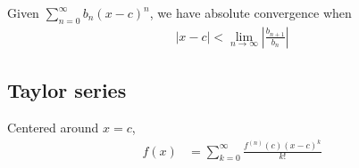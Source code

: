 \documentclass[12pt]{article}
\newcommand{\abs}  [1]{\left|       #1 \right|      }
\begin{document}
\begin{multicols}{2}
Given $\sum_{n=0}^\infty b_n (x-c)^n$, we have absolute convergence when
\begin{align*}
    \abs{x-c} < \lim_{n\to\infty} \abs{\frac{b_{n+1}}{b_n}}
\end{align*}

\subsection*{Taylor series}
Centered around $x=c$,
\begin{align*}
    f(x) &= \sum_{k=0}^\infty \frac{f^{(n)}(c) (x-c)^k}{k!}
\end{align*}

\end{multicols}
\end{document}
